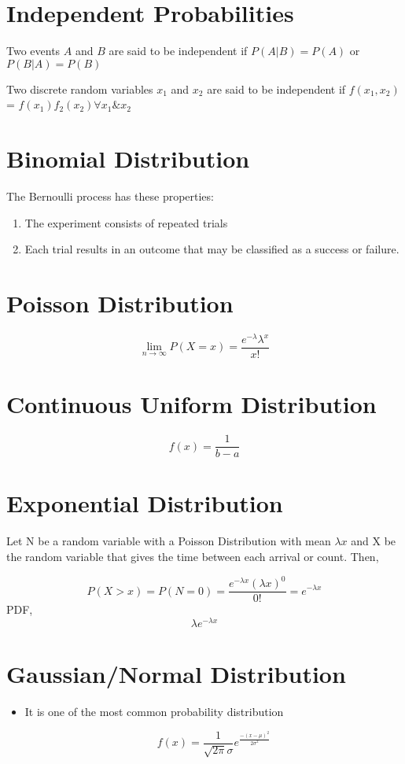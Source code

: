 \documentclass[11pt]{report}
\begin{document}
\section{Independent Probabilities}
\label{sec:orgb0461d1}

Two events \(A\) and \(B\) are said to be independent if \(P(A|B) = P(A)\) or \(P(B|A) = P(B)\)

Two discrete random variables \(x_1\) and \(x_2\) are said to be independent if \(f(x_1,x_2)\) = \(f(x_1)f_2(x_2) \forall x_1 \& x_2\)
\section{Binomial Distribution}
\label{sec:org57114ca}
The Bernoulli process has these properties:
\begin{enumerate}
\item The experiment consists of repeated trials
\item Each trial results in an outcome that may be classified as a success or failure.
\end{enumerate}
\section{Poisson Distribution}
\label{sec:orge3a7201}
$$\lim_{n \rightarrow \infty} P(X=x) = \frac{e^{-\lambda}\lambda^x}{x!}$$
\section{Continuous Uniform Distribution}
\label{sec:org7fd9ea7}
$$f(x) = \frac{1}{b-a}$$
\section{Exponential Distribution}
\label{sec:orgdfd2be2}
Let N be a random variable with a Poisson Distribution with mean \(\lambda x\) and X be the random variable that gives the time between each arrival or count. Then,


$$P(X > x) = P(N=0) = \frac{e^{-\lambda x}(\lambda x)^0}{0!} = e^{-\lambda x}$$
PDF,
$$\lambda e^{-\lambda x}$$
\section{Gaussian/Normal Distribution}
\label{sec:org65e5306}
\begin{itemize}
\item It is one of the most common probability distribution

$$f(x) = \frac{1}{\sqrt{2 \pi} \sigma} e^{\frac{-(x-\mu)^2}{2 \sigma^2}}$$
\end{itemize}
\end{document}
